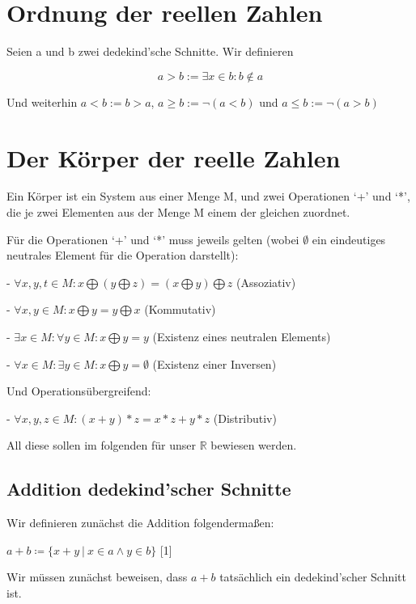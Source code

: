 \documentclass[12pt]{article}
\begin{document}
    \section{Ordnung der reellen Zahlen}

    Seien a und b zwei dedekind'sche Schnitte. Wir definieren

    \[a > b := \exists x \in b: b \not \in a\]

    Und weiterhin $a < b := b > a$, $a \ge b := \lnot (a < b)$ und $a \le b := \lnot (a > b)$

    \section{Der Körper der reelle Zahlen}

    Ein Körper ist ein System aus einer Menge M, und zwei Operationen `+' und `*', die je zwei Elementen aus der Menge
    M einem der gleichen zuordnet.

    Für die Operationen `+' und `*' muss jeweils gelten (wobei $\emptyset$ ein eindeutiges neutrales Element für
    die Operation darstellt):

    - $\forall x, y, t \in M: x \bigoplus (y \bigoplus z) = (x \bigoplus y) \bigoplus z$  (Assoziativ)

    - $\forall x, y \in M: x \bigoplus y = y \bigoplus x$  (Kommutativ)

    - $\exists x \in M: \forall y \in M: x \bigoplus y = y$  (Existenz eines neutralen Elements)

    - $\forall x \in M: \exists y \in M: x \bigoplus y = \emptyset$  (Existenz einer Inversen)

    Und Operationsübergreifend:

    - $\forall x, y, z \in M: (x + y) * z = x * z + y * z$ (Distributiv)

    All diese sollen im folgenden für unser $\mathbb{R}$ bewiesen werden.

    \subsection{Addition dedekind'scher Schnitte}

    Wir definieren zunächst die Addition folgendermaßen:

    $a + b \coloneqq \{x + y \mspace{4mu} | \mspace{4mu} x \in a \land y \in b\}$ [1]

    Wir müssen zunächst beweisen, dass $a + b$ tatsächlich ein dedekind'scher Schnitt ist.
\end{document}
